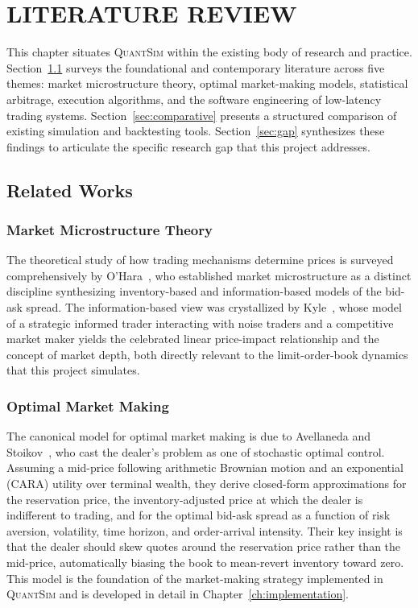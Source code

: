 \documentclass[12pt,oneside,a4paper]{report}
\newcommand{\quantsim}{\textsc{QuantSim}}
\begin{document}
\chapter{LITERATURE REVIEW}
\label{ch:litreview}

This chapter situates \quantsim{} within the existing body of research and practice. Section~\ref{sec:relatedworks} surveys the foundational and contemporary literature across five themes: market microstructure theory, optimal market-making models, statistical arbitrage, execution algorithms, and the software engineering of low-latency trading systems. Section~\ref{sec:comparative} presents a structured comparison of existing simulation and backtesting tools. Section~\ref{sec:gap} synthesizes these findings to articulate the specific research gap that this project addresses.

\section{Related Works}
\label{sec:relatedworks}

\subsection{Market Microstructure Theory}

The theoretical study of how trading mechanisms determine prices is surveyed comprehensively by O'Hara~\cite{ohara1995}, who established market microstructure as a distinct discipline synthesizing inventory-based and information-based models of the bid-ask spread. The information-based view was crystallized by Kyle~\cite{kyle1985}, whose model of a strategic informed trader interacting with noise traders and a competitive market maker yields the celebrated linear price-impact relationship and the concept of market depth, both directly relevant to the limit-order-book dynamics that this project simulates.

\subsection{Optimal Market Making}

The canonical model for optimal market making is due to Avellaneda and Stoikov~\cite{avellaneda2008}, who cast the dealer's problem as one of stochastic optimal control. Assuming a mid-price following arithmetic Brownian motion and an exponential (CARA) utility over terminal wealth, they derive closed-form approximations for the reservation price, the inventory-adjusted price at which the dealer is indifferent to trading, and for the optimal bid-ask spread as a function of risk aversion, volatility, time horizon, and order-arrival intensity. Their key insight is that the dealer should skew quotes around the reservation price rather than the mid-price, automatically biasing the book to mean-revert inventory toward zero. This model is the foundation of the market-making strategy implemented in \quantsim{} and is developed in detail in Chapter~\ref{ch:implementation}.
\end{document}
